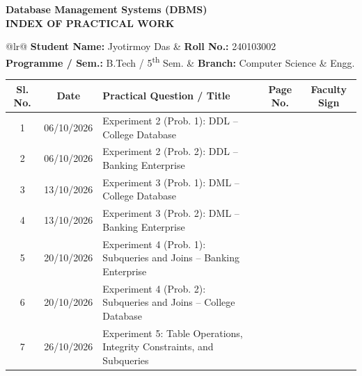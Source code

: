 \documentclass[12pt,a4paper]{article}
\begin{document}
\begin{center}
    {\LARGE \textbf{Database Management Systems (DBMS)}}\\[0.25cm]
    {\Large \textbf{INDEX OF PRACTICAL WORK}}
\end{center}

\vspace{0.4cm}

\noindent\begin{tabular*}{\linewidth}{@{\extracolsep{\fill}}lr@{}}
\textbf{Student Name:} Jyotirmoy Das & \textbf{Roll No.:} 240103002 \\[0.2cm]
\textbf{Programme / Sem.:} B.Tech / 5\textsuperscript{th} Sem. & \textbf{Branch:} Computer Science \& Engg. \\[0.2cm]
\end{tabular*}

\vspace{0.4cm}

\renewcommand{\arraystretch}{1.45}
\noindent\begin{tabularx}{\linewidth}{|c|c|>{\raggedright\arraybackslash}X|c|c|}
\hline
\textbf{Sl. No.} & \textbf{Date} & \textbf{Practical Question / Title} & \textbf{Page No.} & \textbf{Faculty Sign} \\ \hline
1 & 06/10/2026 & Experiment 2 (Prob. 1): DDL -- College Database & \pageref{exp:ddl_prob1} & \\ \hline
2 & 06/10/2026 & Experiment 2 (Prob. 2): DDL -- Banking Enterprise & \pageref{exp:ddl_prob2} & \\ \hline
3 & 13/10/2026 & Experiment 3 (Prob. 1): DML -- College Database & \pageref{exp:dml_prob1} & \\ \hline
4 & 13/10/2026 & Experiment 3 (Prob. 2): DML -- Banking Enterprise & \pageref{exp:dml_prob2} & \\ \hline
5 & 20/10/2026 & Experiment 4 (Prob. 1): Subqueries and Joins -- Banking Enterprise & \pageref{exp:subqueries_prob1} & \\ \hline
6 & 20/10/2026 & Experiment 4 (Prob. 2): Subqueries and Joins -- College Database & \pageref{exp:subqueries_prob2} & \\ \hline
7 & 26/10/2026 & Experiment 5: Table Operations, Integrity Constraints, and Subqueries & \pageref{exp:nested_queries_practice} & \\ \hline
\end{tabularx}

\newpage




\newpage



\newpage



\newpage


\end{document}

